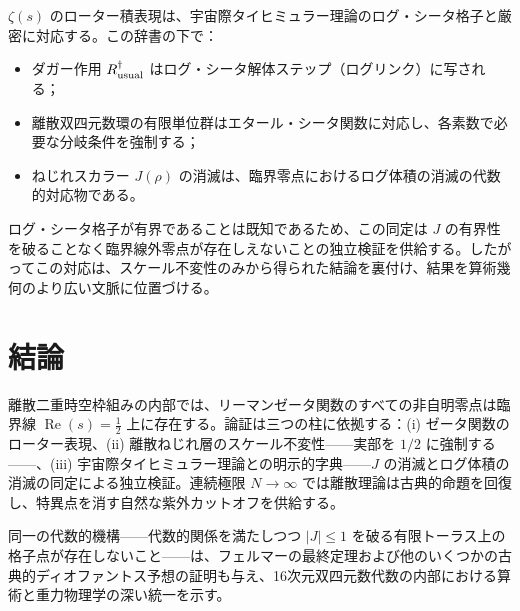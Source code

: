 \documentclass[a4paper]{article}
\begin{document}
$\zeta(s)$ のローター積表現は、宇宙際タイヒミュラー理論のログ・シータ格子と厳密に対応する。この辞書の下で：
\begin{itemize}
\item ダガー作用 $R_{\rm usual}^\dagger$ はログ・シータ解体ステップ（ログリンク）に写される；
\item 離散双四元数環の有限単位群はエタール・シータ関数に対応し、各素数で必要な分岐条件を強制する；
\item ねじれスカラー $J(\rho)$ の消滅は、臨界零点におけるログ体積の消滅の代数的対応物である。
\end{itemize}
ログ・シータ格子が有界であることは既知であるため、この同定は $J$ の有界性を破ることなく臨界線外零点が存在しえないことの独立検証を供給する。したがってこの対応は、スケール不変性のみから得られた結論を裏付け、結果を算術幾何のより広い文脈に位置づける。

\section{結論}

離散二重時空枠組みの内部では、リーマンゼータ関数のすべての非自明零点は臨界線 $\operatorname{Re}(s)=\frac12$ 上に存在する。論証は三つの柱に依拠する：(i) ゼータ関数のローター表現、(ii) 離散ねじれ層のスケール不変性——実部を $1/2$ に強制する——、(iii) 宇宙際タイヒミュラー理論との明示的字典——$J$ の消滅とログ体積の消滅の同定による独立検証。連続極限 $N\to\infty$ では離散理論は古典的命題を回復し、特異点を消す自然な紫外カットオフを供給する。

同一の代数的機構——代数的関係を満たしつつ $|J|\le 1$ を破る有限トーラス上の格子点が存在しないこと——は、フェルマーの最終定理および他のいくつかの古典的ディオファントス予想の証明も与え、16次元双四元数代数の内部における算術と重力物理学の深い統一を示す。
\end{document}
